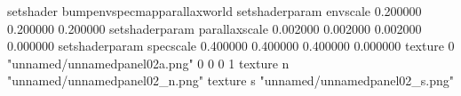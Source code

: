 setshader bumpenvspecmapparallaxworld
setshaderparam envscale 0.200000 0.200000 0.200000
setshaderparam parallaxscale 0.002000 0.002000 0.002000 0.000000
setshaderparam specscale 0.400000 0.400000 0.400000 0.000000
texture 0 "unnamed/unnamedpanel02a.png" 0 0 0 1
texture n "unnamed/unnamedpanel02_n.png"
texture s "unnamed/unnamedpanel02_s.png"